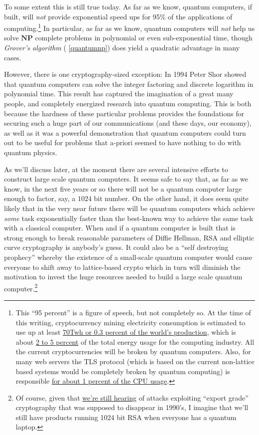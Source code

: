 To some extent this is still true today. As far as we know, quantum
computers, if built, will \emph{not} provide exponential speed ups for
95\% of the applications of computing.\footnote{This ``95 percent'' is a
  figure of speech, but not completely so. At the time of this writing,
  cryptocurrency mining electricity consumption is estimated to use up
  at least
  \href{https://digiconomist.net/bitcoin-energy-consumption}{70Twh or
  0.3 percent of the world's production}, which is about
  \href{http://www.mdpi.com/2078-1547/6/1/117/html}{2 to 5 percent} of
  the total energy usage for the computing industry. All the current
  cryptocurrencies will be broken by quantum computers. Also, for many
  web servers the TLS protocol (which is based on the current
  non-lattice based systems would be completely broken by quantum
  computing) is responsible \href{https://goo.gl/mHpYpm}{for about 1
  percent of the CPU usage}.} In particular, as far as we know, quantum
computers will \emph{not} help us solve \(\mathbf{NP}\) complete
problems in polynomial or even sub-exponential time, though
\emph{Grover's algorithm} ( \cref{quantumnp}) does yield a quadratic
advantage in many cases.

However, there is one cryptography-sized exception: In 1994 Peter Shor
showed that quantum computers can solve the integer factoring and
discrete logarithm in polynomial time. This result has captured the
imagination of a great many people, and completely energized research
into quantum computing. This is both because the hardness of these
particular problems provides the foundations for securing such a huge
part of our communications (and these days, our economy), as well as it
was a powerful demonstration that quantum computers could turn out to be
useful for problems that a-priori seemed to have nothing to do with
quantum physics.

As we'll discuss later, at the moment there are several intensive
efforts to construct large scale quantum computers. It seems safe to say
that, as far as we know, in the next five years or so there will not be
a quantum computer large enough to factor, say, a \(1024\) bit number.
On the other hand, it does seem quite likely that in the very near
future there will be quantum computers which achieve \emph{some} task
exponentially faster than the best-known way to achieve the same task
with a classical computer. When and if a quantum computer is built that
is strong enough to break reasonable parameters of Diffie Hellman, RSA
and elliptic curve cryptography is anybody's guess. It could also be a
``self destroying prophecy'' whereby the existence of a small-scale
quantum computer would cause everyone to shift away to lattice-based
crypto which in turn will diminish the motivation to invest the huge
resources needed to build a large scale quantum computer.\footnote{Of
  course, given that
  \href{http://blog.cryptographyengineering.com/2016/03/attack-of-week-drown.html}{we're
  still hearing} of attacks exploiting ``export grade'' cryptography
  that was supposed to disappear in 1990's, I imagine that we'll still
  have products running 1024 bit RSA when everyone has a quantum laptop.}


